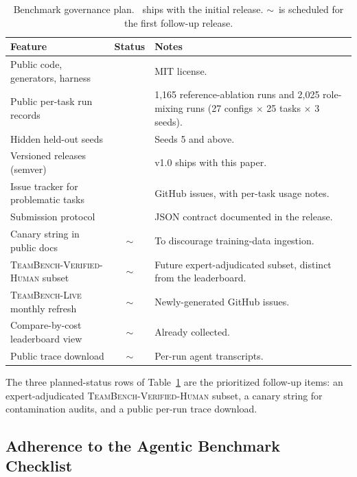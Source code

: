\documentclass{article}
\newcommand{\gcmark}{\textcolor{green!55!black}{\ding{51}}}
\newcommand{\partialmark}{\textcolor{orange!85!black}{$\sim$}}
\begin{document}
\begin{table}[h]
\centering
\caption{Benchmark governance plan. \gcmark\ ships with the initial release. \partialmark\ is scheduled for the first follow-up release.}
\label{tab:governance}
\small
\setlength{\tabcolsep}{6pt}
\begin{tabular}{p{4.6cm}cp{6.8cm}}
\toprule
Feature & Status & Notes \\
\midrule
Public code, generators, harness         & \gcmark      & MIT license. \\
Public per-task run records              & \gcmark      & 1{,}165 reference-ablation runs and 2{,}025 role-mixing runs (27 configs $\times$ 25 tasks $\times$ 3 seeds). \\
Hidden held-out seeds                    & \gcmark      & Seeds 5 and above. \\
Versioned releases (semver)              & \gcmark      & v1.0 ships with this paper. \\
Issue tracker for problematic tasks      & \gcmark      & GitHub issues, with per-task usage notes. \\
Submission protocol                      & \gcmark      & JSON contract documented in the release. \\
Canary string in public docs             & \partialmark & To discourage training-data ingestion. \\
\textsc{TeamBench-Verified-Human} subset & \partialmark & Future expert-adjudicated subset, distinct from the leaderboard. \\
\textsc{TeamBench-Live} monthly refresh  & \partialmark & Newly-generated GitHub issues. \\
Compare-by-cost leaderboard view         & \partialmark & Already collected. \\
Public trace download                    & \partialmark & Per-run agent transcripts. \\
\bottomrule
\end{tabular}
\end{table}

The three planned-status rows of Table~\ref{tab:governance} are the prioritized follow-up items: an expert-adjudicated \textsc{TeamBench-Verified-Human} subset, a canary string for contamination audits, and a public per-run trace download.

\subsection{Adherence to the Agentic Benchmark Checklist}
\label{app:abc}
\end{document}
